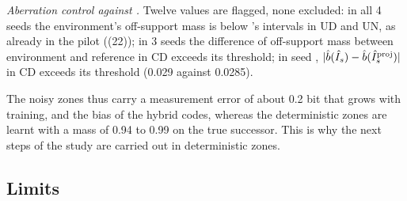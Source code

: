 \documentclass[10pt]{article}
\begin{document}
\emph{Aberration control against \EThreeZero.} Twelve values are flagged, none excluded: in all 4 seeds the %
environment's off-support mass is below \EThreeZero's intervals in UD and UN, as already in the pilot ((22)); in 3 seeds %
the difference of off-support mass between environment and reference in CD exceeds its threshold; in seed
\eThreeCampaignSeedB{}, $|\hat{b}(\hat{I}_{s}) - \hat{b}(\hat{I}_{s}^{\mathrm{proj}})|$ in CD exceeds its threshold (0.029 against 0.0285). %

The noisy zones thus carry a measurement error of about 0.2 bit that grows with training, and the bias of the hybrid %
codes, whereas the deterministic zones are learnt with a mass of 0.94 to 0.99 on the true successor. This is why the %
next steps of the study are carried out in deterministic zones.

\subsection{Limits}
\label{sec:results-limits}
\end{document}
